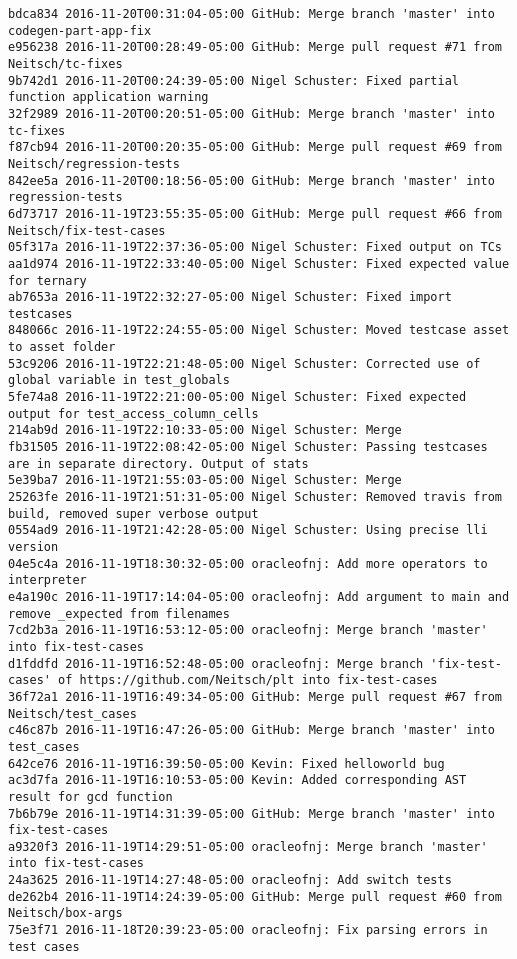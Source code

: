 \begin{lstlisting}
bdca834 2016-11-20T00:31:04-05:00 GitHub: Merge branch 'master' into codegen-part-app-fix
e956238 2016-11-20T00:28:49-05:00 GitHub: Merge pull request #71 from Neitsch/tc-fixes
9b742d1 2016-11-20T00:24:39-05:00 Nigel Schuster: Fixed partial function application warning
32f2989 2016-11-20T00:20:51-05:00 GitHub: Merge branch 'master' into tc-fixes
f87cb94 2016-11-20T00:20:35-05:00 GitHub: Merge pull request #69 from Neitsch/regression-tests
842ee5a 2016-11-20T00:18:56-05:00 GitHub: Merge branch 'master' into regression-tests
6d73717 2016-11-19T23:55:35-05:00 GitHub: Merge pull request #66 from Neitsch/fix-test-cases
05f317a 2016-11-19T22:37:36-05:00 Nigel Schuster: Fixed output on TCs
aa1d974 2016-11-19T22:33:40-05:00 Nigel Schuster: Fixed expected value for ternary
ab7653a 2016-11-19T22:32:27-05:00 Nigel Schuster: Fixed import testcases
848066c 2016-11-19T22:24:55-05:00 Nigel Schuster: Moved testcase asset to asset folder
53c9206 2016-11-19T22:21:48-05:00 Nigel Schuster: Corrected use of global variable in test_globals
5fe74a8 2016-11-19T22:21:00-05:00 Nigel Schuster: Fixed expected output for test_access_column_cells
214ab9d 2016-11-19T22:10:33-05:00 Nigel Schuster: Merge
fb31505 2016-11-19T22:08:42-05:00 Nigel Schuster: Passing testcases are in separate directory. Output of stats
5e39ba7 2016-11-19T21:55:03-05:00 Nigel Schuster: Merge
25263fe 2016-11-19T21:51:31-05:00 Nigel Schuster: Removed travis from build, removed super verbose output
0554ad9 2016-11-19T21:42:28-05:00 Nigel Schuster: Using precise lli version
04e5c4a 2016-11-19T18:30:32-05:00 oracleofnj: Add more operators to interpreter
e4a190c 2016-11-19T17:14:04-05:00 oracleofnj: Add argument to main and remove _expected from filenames
7cd2b3a 2016-11-19T16:53:12-05:00 oracleofnj: Merge branch 'master' into fix-test-cases
d1fddfd 2016-11-19T16:52:48-05:00 oracleofnj: Merge branch 'fix-test-cases' of https://github.com/Neitsch/plt into fix-test-cases
36f72a1 2016-11-19T16:49:34-05:00 GitHub: Merge pull request #67 from Neitsch/test_cases
c46c87b 2016-11-19T16:47:26-05:00 GitHub: Merge branch 'master' into test_cases
642ce76 2016-11-19T16:39:50-05:00 Kevin: Fixed helloworld bug
ac3d7fa 2016-11-19T16:10:53-05:00 Kevin: Added corresponding AST result for gcd function
7b6b79e 2016-11-19T14:31:39-05:00 GitHub: Merge branch 'master' into fix-test-cases
a9320f3 2016-11-19T14:29:51-05:00 oracleofnj: Merge branch 'master' into fix-test-cases
24a3625 2016-11-19T14:27:48-05:00 oracleofnj: Add switch tests
de262b4 2016-11-19T14:24:39-05:00 GitHub: Merge pull request #60 from Neitsch/box-args
75e3f71 2016-11-18T20:39:23-05:00 oracleofnj: Fix parsing errors in test cases

\end{lstlisting}
